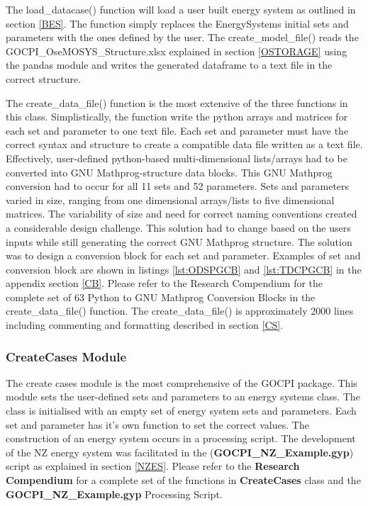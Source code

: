 \documentclass[12pt]{article}
\begin{document}
The load\_datacase() function will load a user built energy system as outlined in section \ref{BES}. 
The function simply replaces the EnergySystems initial sets and parameters with the ones defined by the user.
The create\_model\_file() reads the GOCPI\_OseMOSYS\_Structure.xlsx explained in section \ref{OSTORAGE} using the pandas module and writes the generated dataframe to a text file in the correct structure.

The create\_data\_file() function is the most extensive of the three functions in this class.
Simplistically, the function write the python arrays and matrices for each set and parameter to one text file.
Each set and parameter must have the correct syntax and structure to create a compatible data file written as a text file.
Effectively, user-defined python-based multi-dimensional lists/arrays had to be converted into GNU Mathprog-structure data blocks.
This GNU Mathprog conversion had to occur for all 11 sets and 52 parameters.
Sets and parameters varied in size, ranging from one dimensional arrays/lists to five dimensional matrices.
The variability of size and need for correct naming conventions created a considerable design challenge.
This solution had to change based on the users inputs while still generating the correct GNU Mathprog structure.
The solution was to design a conversion block for each set and parameter. 
Examples of set and conversion block are shown in listings \ref{lst:ODSPGCB} and \ref{lst:TDCPGCB} in the appendix section \ref{CB}.
Please refer to the Research Compendium for the complete set of 63 Python to GNU Mathprog Conversion Blocks in the create\_data\_file() function.
The create\_data\_file() is approximately 2000 lines including commenting and formatting described in section \ref{CS}.

\subsubsection{CreateCases Module}
The create cases module is the most comprehensive of the GOCPI package.
This module sets the user-defined sets and parameters to an energy systems class.
The class is initialised with an empty set of energy system sets and parameters. 
Each set and parameter has it's own function to set the correct values.
The construction of an energy system occurs in a processing script.
The development of the NZ energy system was facilitated in the (\textbf{GOCPI\_NZ\_Example.gyp}) script as explained in section \ref{NZES}.
Please refer to the \textbf{Research Compendium} for a complete set of the functions in \textbf{CreateCases} class and the \textbf{GOCPI\_NZ\_Example.gyp} Processing Script.
\end{document}
